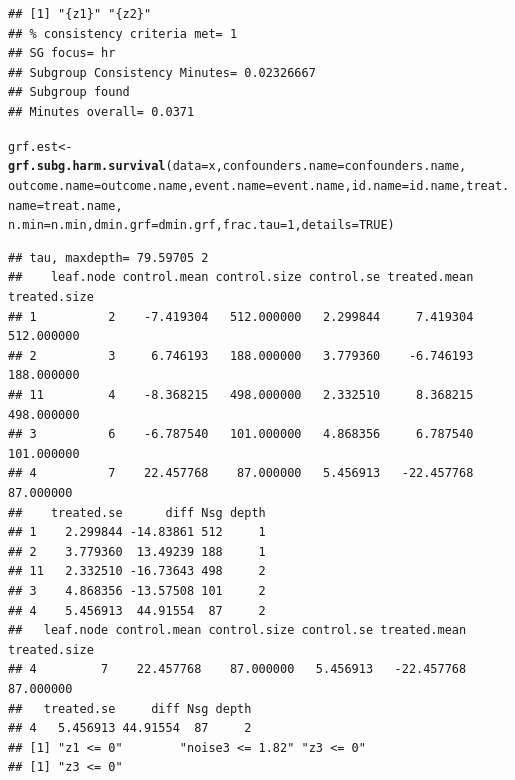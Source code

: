\documentclass[smallextended]{svjour3}
\makeatletter
\newcommand{\hlnum}[1]{\textcolor[rgb]{0.686,0.059,0.569}{#1}}%
\newcommand{\hlstd}[1]{\textcolor[rgb]{0.345,0.345,0.345}{#1}}%
\newcommand{\hlkwb}[1]{\textcolor[rgb]{0.69,0.353,0.396}{#1}}%
\newcommand{\hlkwc}[1]{\textcolor[rgb]{0.333,0.667,0.333}{#1}}%
\newcommand{\hlkwd}[1]{\textcolor[rgb]{0.737,0.353,0.396}{\textbf{#1}}}%
\newenvironment{kframe}{%
 \def\at@end@of@kframe{}%
 \ifinner\ifhmode%
  \def\at@end@of@kframe{\end{minipage}}%
  \begin{minipage}{\columnwidth}%
 \fi\fi%
 \def\FrameCommand##1{\hskip\@totalleftmargin \hskip-\fboxsep
 \colorbox{shadecolor}{##1}\hskip-\fboxsep
     \hskip-\linewidth \hskip-\@totalleftmargin \hskip\columnwidth}%
 \MakeFramed {\advance\hsize-\width
   \@totalleftmargin\z@ \linewidth\hsize
   \@setminipage}}%
 {\par\unskip\endMakeFramed%
 \at@end@of@kframe}
\newenvironment{knitrout}{}{} %
\makeatother
\begin{document}
\begin{knitrout}
\begin{kframe}
\begin{verbatim}
## [1] "{z1}" "{z2}"
## % consistency criteria met= 1 
## SG focus= hr 
## Subgroup Consistency Minutes= 0.02326667 
## Subgroup found 
## Minutes overall= 0.0371
\end{verbatim}
\begin{alltt}
\hlstd{grf.est} \hlkwb{<-} \hlkwd{grf.subg.harm.survival}\hlstd{(}\hlkwc{data} \hlstd{= x,} \hlkwc{confounders.name} \hlstd{= confounders.name,}
    \hlkwc{outcome.name} \hlstd{= outcome.name,} \hlkwc{event.name} \hlstd{= event.name,} \hlkwc{id.name} \hlstd{= id.name,} \hlkwc{treat.name} \hlstd{= treat.name,}
    \hlkwc{n.min} \hlstd{= n.min,} \hlkwc{dmin.grf} \hlstd{= dmin.grf,} \hlkwc{frac.tau} \hlstd{=} \hlnum{1}\hlstd{,} \hlkwc{details} \hlstd{=} \hlnum{TRUE}\hlstd{)}
\end{alltt}
\begin{verbatim}
## tau, maxdepth= 79.59705 2 
##    leaf.node control.mean control.size control.se treated.mean treated.size
## 1          2    -7.419304   512.000000   2.299844     7.419304   512.000000
## 2          3     6.746193   188.000000   3.779360    -6.746193   188.000000
## 11         4    -8.368215   498.000000   2.332510     8.368215   498.000000
## 3          6    -6.787540   101.000000   4.868356     6.787540   101.000000
## 4          7    22.457768    87.000000   5.456913   -22.457768    87.000000
##    treated.se      diff Nsg depth
## 1    2.299844 -14.83861 512     1
## 2    3.779360  13.49239 188     1
## 11   2.332510 -16.73643 498     2
## 3    4.868356 -13.57508 101     2
## 4    5.456913  44.91554  87     2
##   leaf.node control.mean control.size control.se treated.mean treated.size
## 4         7    22.457768    87.000000   5.456913   -22.457768    87.000000
##   treated.se     diff Nsg depth
## 4   5.456913 44.91554  87     2
## [1] "z1 <= 0"        "noise3 <= 1.82" "z3 <= 0"       
## [1] "z3 <= 0"
\end{verbatim}
\end{kframe}
\end{knitrout}
\end{document}
